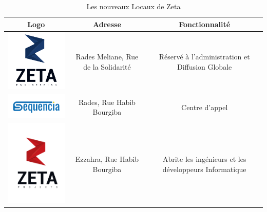 \begin{table}[H]
\begin{center}
     \begin{tabular}{|c{5cm}|c{5cm}|c{5cm}|}
    \hline
	\textbf{Logo}         & \textbf{Adresse}   & \textbf{Fonctionnalité} \\
    \hline
    
	\includegraphics[width=5cm]{Images/logo-zeta1.png} & Rades Meliane, Rue de la Solidarité  & Réservé à l'administration et Diffusion Globale  \\
	
 	\hline
 	
	\includegraphics[width=5cm]{Images/logo-Sequencia.png}   &  Rades, Rue Habib Bourgiba  &  Centre d'appel \\
	
	\hline
	
	\includegraphics[width=5cm]{Images/Logo-ZetaProject.png}  & Ezzahra, Rue Habib Bourgiba    & Abrite les ingénieurs et les développeurs Informatique  \\
	
	\hline
	
     \end{tabular}
     \caption{Les nouveaux Locaux de Zeta}
     \label{1}
     \end{center}
\end{table}

